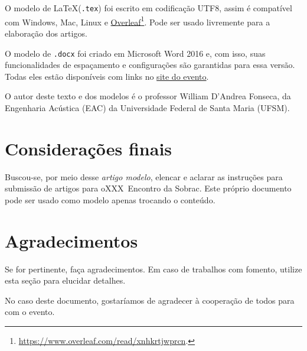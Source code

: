 O modelo de \LaTeX\xspace (\texttt{.tex}) foi escrito em codificação UTF8, assim é compatível com Windows, Mac, Linux e \href{https://www.overleaf.com/read/xnhkrtjwprcn}{Overleaf}\footnote{\url{https://www.overleaf.com/read/xnhkrtjwprcn}.}. Pode ser usado livremente para a elaboração dos artigos.

O modelo de \texttt{.docx} foi criado em Microsoft Word 2016 e, com isso, suas funcionalidades de espaçamento e configurações são garantidas para essa versão. Todas eles estão disponíveis com links no \href{https://www.even3.com.br/sobracnatal2023}{site do evento}.

O autor deste texto e dos modelos é o professor William D'Andrea Fonseca, da Engenharia Acústica (EAC) da Universidade Federal de Santa Maria (UFSM).

\section{Considerações finais}

Buscou-se, por meio desse \textit{artigo modelo}, elencar e aclarar as instruções para submissão de artigos para o\linebreak XXX~Encontro da Sobrac. 
Este próprio documento pode ser usado como modelo apenas trocando o conteúdo.

\section{Agradecimentos}

Se for pertinente, faça agradecimentos.
%
Em caso de trabalhos com fomento, utilize esta seção para elucidar detalhes.

No caso deste documento, gostaríamos de agradecer à cooperação de todos para com o evento.
